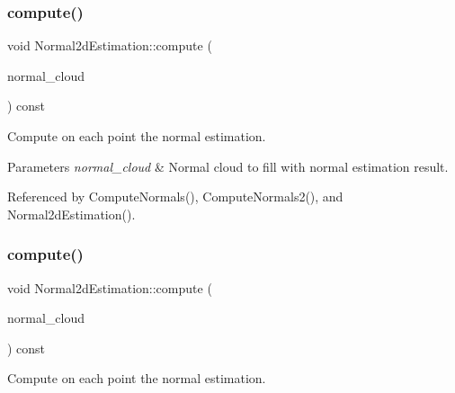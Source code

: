\mbox{\label{classNormal2dEstimation_a908d3a85cda5b29bb3ef119ab30d6ab6}} 
\subsubsection{\texorpdfstring{compute()}{compute()}\hspace{0.1cm}{\footnotesize\ttfamily [2/4]}}
{\footnotesize\ttfamily void Normal2d\+Estimation\+::compute (\begin{DoxyParamCaption}\item[{const \hyperlink{Normal2dEstimation_8h_a2894055ff89c63cbae90e22dfddaa610}{Ptr\+Cloud} \&}]{normal\+\_\+cloud }\end{DoxyParamCaption}) const}



Compute on each point the normal estimation. 


\begin{DoxyParams}{Parameters}
{\em normal\+\_\+cloud} & Normal cloud to fill with normal estimation result. \\
\hline
\end{DoxyParams}


Referenced by Compute\+Normals(), Compute\+Normals2(), and Normal2d\+Estimation().

\mbox{\label{classNormal2dEstimation_ac3fd17679a20a7f4faab72f58fdc6199}} 
\subsubsection{\texorpdfstring{compute()}{compute()}\hspace{0.1cm}{\footnotesize\ttfamily [3/4]}}
{\footnotesize\ttfamily void Normal2d\+Estimation\+::compute (\begin{DoxyParamCaption}\item[{const \hyperlink{test0426_8cc_a6c737bbce051bc4690e4c608adc2deec}{pcl\+::\+Point\+Cloud}$<$ pcl\+::\+Normal $>$\+::Ptr \&}]{normal\+\_\+cloud }\end{DoxyParamCaption}) const}



Compute on each point the normal estimation. 


